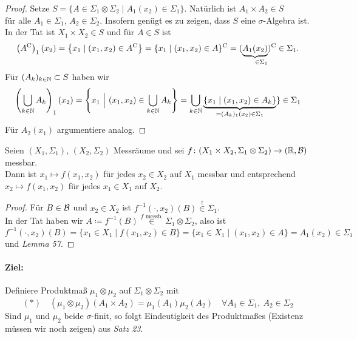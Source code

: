 \documentclass[skript.tex]{subfiles}
\begin{document}
	\begin{proof}
		Setze $S = \{A \in \Sigma_1\otimes\Sigma_2 \mid A_1(x_2)\in\Sigma_1\}$. Natürlich ist $A_1\times A_2 \in S$ \\
		für alle $A_1\in\Sigma_1$, $A_2\in\Sigma_2$. Insofern genügt es zu zeigen, dass $S$ eine $\sigma$-Algebra ist. \\
		In der Tat ist $X_1 \times X_2 \in S$ und für $A \in S$ ist
		\[
			\left(\cp{A}\right)_1(x_2) = \left\{x_1 \mid (x_1,x_2) \in \cp{A}\right\}
			= \cp{\{x_1 \mid (x_1,x_2) \in A\}}
			= \cp{(\underbrace{A_1(x_2)}_{\mathrlap{\in\Sigma_1}})} \in \Sigma_1.
		\]
		Für $(A_k)_{k\in\mathbb{N}} \subset S$ haben wir
		\[
			\left( \bigcup_{k\in\mathbb{N}} A_k \right)_1(x_2)
			= \left\{ x_1\ \Big\vert\ (x_1,x_2) \in \bigcup_{k\in\mathbb{N}}A_k \right\}
			= \bigcup_{k\in\mathbb{N}}\underbrace{\{x_1 \mid (x_1,x_2) \in A_k\}}_{= (A_k)_1(x_2) \in \Sigma_1}\} \in \Sigma_1
		\]
		Für $A_2(x_1)$ argumentiere analog.
	\end{proof}

	\begin{cor}
		Seien $(X_1,\Sigma_1)$, $(X_2,\Sigma_2)$ Messräume und sei $f \colon (X_1 \times X_2, \Sigma_1 \otimes \Sigma_2) \to (\mathbb{R},\mathcal{B})$ messbar. \\
		Dann ist  $x_1 \mapsto f(x_1,x_2)$ für jedes $x_2 \in X_2$ auf $X_1$ messbar und entsprechend $x_2 \mapsto f(x_1,x_2)$ für jedes $x_1 \in X_1$ auf $X_2$.
	\end{cor}
	\begin{proof}
		Für $B \in \mathcal{B}$ und $x_2 \in X_2$ ist $f^{-1}(\cdot,x_2)(B) \overset{\text{!}}{\in} \Sigma_1$.\\
		In der Tat haben wir $A \coloneqq f^{-1}(B) \overset{f \text{ messb.}}{\in} \Sigma_1 \otimes \Sigma_2$, also ist
		\[
			f^{-1}(\cdot,x_2)(B)
			= \{x_1 \in X_1 \mid f(x_1,x_2) \in B \}
			= \{x_1 \in X_1 \mid (x_1,x_2) \in A \}
			= A_1(x_2) \in \Sigma_1
		\]
		und \emph{Lemma 57}.
	\end{proof}

	\paragraph{Ziel:} Definiere Produktmaß $\mu_1 \otimes \mu_2$ auf $\Sigma_1 \otimes \Sigma_2$ mit
	\[
		(\ast) \quad (\mu_1 \otimes \mu_2)(A_1 \times A_2) = \mu_1(A_1)\mu_2(A_2) \quad \forall A_1\in\Sigma_1,\ A_2\in\Sigma_2
	\]
	Sind $\mu_1$ und $\mu_2$ beide $\sigma$-finit, so folgt Eindeutigkeit des Produktmaßes (Existenz müssen wir noch zeigen) aus \emph{Satz 23}.
	
\end{document}

